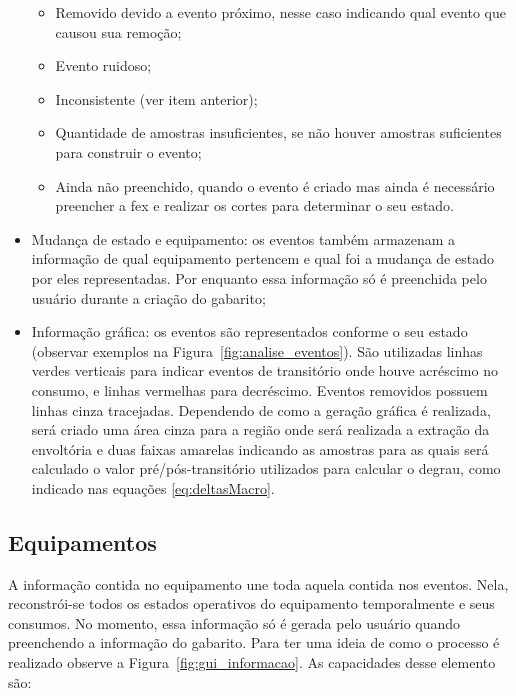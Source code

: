 \begin{itemize}
\begin{itemize}
\item Removido devido a evento próximo, nesse caso indicando qual
evento que causou sua remoção;
\item Evento ruidoso;
\item Inconsistente (ver item anterior);
\item Quantidade de amostras insuficientes, se não houver amostras
suficientes para construir o evento;
\item Ainda não preenchido, quando o evento é criado mas ainda é
necessário preencher a \gls{fex} e realizar os cortes para determinar
o seu estado.
\end{itemize}
\item Mudança de estado e equipamento: os eventos também armazenam a
informação de qual equipamento pertencem e qual foi a mudança de estado
por eles representadas. Por enquanto essa informação só é preenchida
pelo usuário durante a criação do gabarito;
\item Informação gráfica: os eventos são representados conforme o seu
estado (observar exemplos na Figura~\ref{fig:analise_eventos}).
São utilizadas linhas verdes verticais para indicar eventos de
transitório onde houve acréscimo no consumo, e linhas vermelhas para
decréscimo.  Eventos removidos possuem linhas cinza tracejadas.
Dependendo de como a geração gráfica é realizada, será criado uma área
cinza para a região onde será realizada a extração da envoltória e
duas faixas amarelas indicando as amostras para as quais será
calculado o valor pré/pós-transitório utilizados para calcular o
degrau, como indicado nas equações
\ref{eq:deltasMacro}.
\end{itemize}


\subsection{Equipamentos}
\label{ssec:equipamento}

A informação contida no equipamento une toda aquela contida nos eventos.
Nela, reconstrói-se todos os estados operativos do equipamento
temporalmente e seus consumos. No momento, essa informação só é gerada
pelo usuário quando preenchendo a informação do gabarito. Para ter uma
ideia de como o processo é realizado observe a
Figura~\ref{fig:gui_informacao}. As capacidades desse elemento são:

